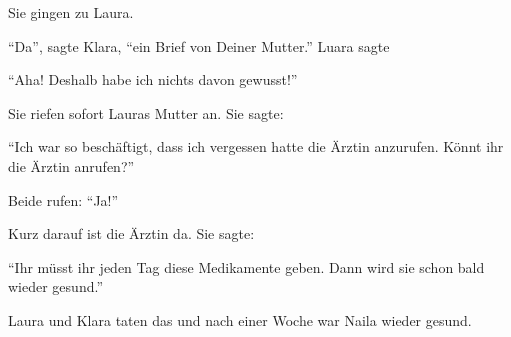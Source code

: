 Sie gingen zu Laura. 

\enquote{Da}, sagte Klara, \enquote{ein Brief von Deiner Mutter.} Luara sagte

\enquote{Aha! Deshalb habe ich nichts davon gewusst!}

Sie riefen sofort Lauras Mutter an. Sie sagte:

\enquote{Ich war so beschäftigt, dass ich vergessen hatte die Ärztin anzurufen. Könnt ihr die Ärztin anrufen?}

Beide rufen:
\enquote{Ja!}

Kurz darauf ist die Ärztin da. Sie sagte:

\enquote{Ihr müsst ihr jeden Tag diese Medikamente geben. Dann wird sie schon bald wieder gesund.}

Laura und Klara taten das und nach einer Woche war Naila wieder gesund. \hfill {}

